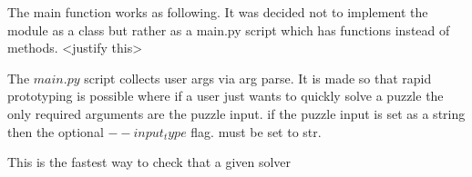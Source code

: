 \documentclass[11pt]{article}
\begin{document}
The main function works as following. It was decided not to implement the module as a class but rather as a main.py script which has functions instead of methods. <justify this>

The $main.py$ script collects user args via arg parse. It is made so that rapid prototyping is possible where if a user just wants to quickly solve a puzzle the only required arguments are the puzzle input. if the puzzle input is set as a string then the optional $--input_type$ flag. must be set to str. 

This is the fastest way to check that a given solver 

%
%
\end{document}
